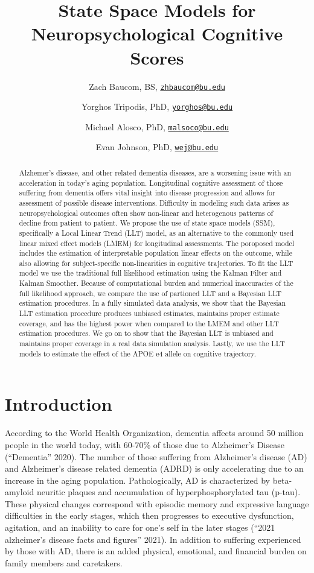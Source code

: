 \documentclass[
]{article}
\title{State Space Models for Neuropsychological Cognitive Scores}
\author{Zach Baucom, BS, \href{mailto:zhbaucom@bu.edu}{\nolinkurl{zhbaucom@bu.edu}} \and Yorghos Tripodis, PhD, \href{mailto:yorghos@bu.edu}{\nolinkurl{yorghos@bu.edu}} \and Michael Alosco, PhD, \href{mailto:malsoco@bu.edu}{\nolinkurl{malsoco@bu.edu}} \and Evan Johnson, PhD, \href{mailto:wej@bu.edu}{\nolinkurl{wej@bu.edu}}}
\date{}
\begin{document}
\maketitle
\begin{abstract}
Alzhemer's disease, and other related dementia diseases, are a worsening issue with an acceleration in today's aging population. Longitudinal cognitive assessment of those suffering from dementia offers vital insight into disease progression and allows for assessment of possible disease interventions. Difficulty in modeling such data arises as neuropsychological outcomes often show non-linear and heterogenous patterns of decline from patient to patient. We propose the use of state space models (SSM), specifically a Local Linear Trend (LLT) model, as an alternative to the commonly used linear mixed effect models (LMEM) for longitudinal assessments. The poroposed model includes the estimation of interpretable population linear effects on the outcome, while also allowing for subject-specific non-linearities in cognitive trajectories. To fit the LLT model we use the traditional full likelihood estimation using the Kalman Filter and Kalman Smoother. Because of computational burden and numerical inaccuracies of the full likelihood approach, we compare the use of partioned LLT and a Bayesian LLT estimation procedures. In a fully simulated data analysis, we show that the Bayesian LLT estimation procedure produces unbiased estimates, maintains proper estimate coverage, and has the highest power when compared to the LMEM and other LLT estimation procedures. We go on to show that the Bayesian LLT is unbiased and maintains proper coverage in a real data simulation analysis. Lastly, we use the LLT models to estimate the effect of the APOE e4 allele on cognitive trajectory.
\end{abstract}

{
\setcounter{tocdepth}{2}
\tableofcontents
}
\newpage{}

\hypertarget{introduction}{%
\section{Introduction}\label{introduction}}

According to the World Health Organization, dementia affects around 50 million people in the world today, with 60-70\% of those due to Alzheimer's Disease ({``Dementia''} 2020). The number of those suffering from Alzheimer's disease (AD) and Alzheimer's disease related dementia (ADRD) is only accelerating due to an increase in the aging population. Pathologically, AD is characterized by beta-amyloid neuritic plaques and accumulation of hyperphosphorylated tau (p-tau). These physical changes correspond with episodic memory and expressive language difficulties in the early stages, which then progresses to executive dysfunction, agitation, and an inability to care for one's self in the later stages ({``2021 alzheimer's disease facts and figures''} 2021). In addition to suffering experienced by those with AD, there is an added physical, emotional, and financial burden on family members and caretakers.
\end{document}
